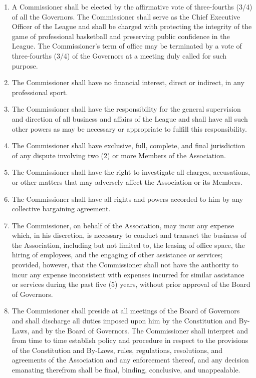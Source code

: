 \documentclass[]{book}
\begin{document}
\begin{enumerate}
\def\labelenumi{(\alph{enumi})}
\item
  A Commissioner shall be elected by the affirmative vote of three-fourths (3/4) of all the Governors. The Commissioner shall serve as the Chief Executive Officer of the League and shall be charged with protecting the integrity of the game of professional basketball and preserving public confidence in the League. The Commissioner's term of office may be terminated by a vote of three-fourths (3/4) of the Governors at a meeting duly called for such purpose.
\item
  The Commissioner shall have no financial interest, direct or indirect, in any professional sport.
\item
  The Commissioner shall have the responsibility for the general supervision and direction of all business and affairs of the League and shall have all such other powers as may be necessary or appropriate to fulfill this responsibility.
\item
  The Commissioner shall have exclusive, full, complete, and final jurisdiction of any dispute involving two (2) or more Members of the Association.
\item
  The Commissioner shall have the right to investigate all charges, accusations, or other matters that may adversely affect the Association or its Members.
\item
  The Commissioner shall have all rights and powers accorded to him by any collective bargaining agreement.
\item
  The Commissioner, on behalf of the Association, may incur any expense which, in his discretion, is necessary to conduct and transact the business of the Association, including but not limited to, the leasing of office space, the hiring of employees, and the engaging of other assistance or services; provided, however, that the Commissioner shall not have the authority to incur any expense inconsistent with expenses incurred for similar assistance or services during the past five (5) years, without prior approval of the Board of Governors.
\item
  The Commissioner shall preside at all meetings of the Board of Governors and shall discharge all duties imposed upon him by the Constitution and By-Laws, and by the Board of Governors. The Commissioner shall interpret and from time to time establish policy and procedure in respect to the provisions of the Constitution and By-Laws, rules, regulations, resolutions, and agreements of the Association and any enforcement thereof, and any decision emanating therefrom shall be final, binding, conclusive, and unappealable.

\end{enumerate}
\end{document}
